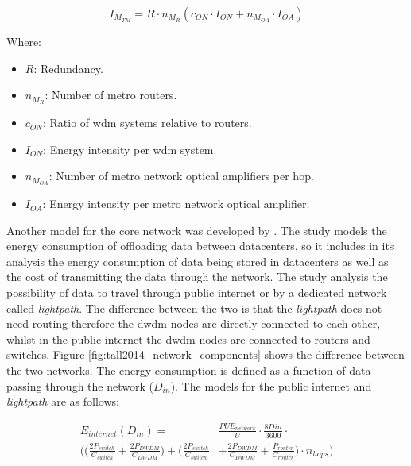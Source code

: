 \begin{equation}
\label{formula:schien_core_metro}
    I_{M_{TM}} = R \cdot n_{M_R} (c_{ON} \cdot I_{ON} + n_{M_{OA}} \cdot I_{OA})
\end{equation}

Where:

\begin{itemize}
    \item $R$: Redundancy.
    \item $n_{M_R}$: Number of metro routers.
    \item $c_{ON}$: Ratio of \ac{wdm} systems relative to routers.
    \item $I_{ON}$: Energy intensity per \ac{wdm} system.
    \item $n_{M_{OA}}$: Number of metro network optical amplifiers per hop.
    \item $I_{OA}$: Energy intensity per metro network optical amplifier.
\end{itemize}



Another model for the core network was developed by \citet{Tall2014}. The study models the energy consumption of offloading data between datacenters, so it includes in  its analysis the energy consumption of data being stored in datacenters as well as the cost of transmitting the data through the network. 
The study analysis the possibility of data to travel through public internet or by a dedicated network called \textit{lightpath}. The difference between the two is that the \textit{lightpath} does not need routing therefore the \ac{dwdm} nodes are directly connected to each other, whilst in the public internet the \ac{dwdm} nodes are connected to routers and switches. Figure \ref{fig:tall2014_network_components} shows the difference between the two networks. The energy consumption is defined as a function of data passing through the network ($D_{in}$). The models for the public internet and \textit{lightpath} are as follows:

\begin{equation}
\label{formula:tall_public_internet}
\begin{split}
    E_{internet}(D_{in}) = & \frac{PUE_{network}}{U} \cdot \frac{8D{in}}{3600} \cdot \\
    \Bigg( \bigg( \frac{2P_{switch}}{C_{switch}} + \frac{2P_{DWDM}}{C_{DWDM}} \bigg) + \bigg(\frac{2P_{switch}}{C_{switch}} & + \frac{2P_{DWDM}}{C_{DWDM}} + \frac{P_{router}}{C_{router}}\bigg) \cdot n_{hops} \Bigg)
\end{split}
\end{equation}

